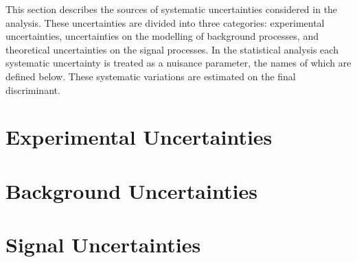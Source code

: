 
This section describes the sources of systematic uncertainties considered in the analysis. 
These uncertainties are divided into three categories: experimental uncertainties, uncertainties on the modelling of background processes, and theoretical uncertainties on the signal processes. In the statistical analysis each systematic uncertainty is treated as a nuisance parameter, the names of which are defined below.
These systematic variations are estimated on the final discriminant.

%
\section{Experimental Uncertainties}

%
\clearpage
\section{Background Uncertainties}

%
\clearpage
\section{Signal Uncertainties}


